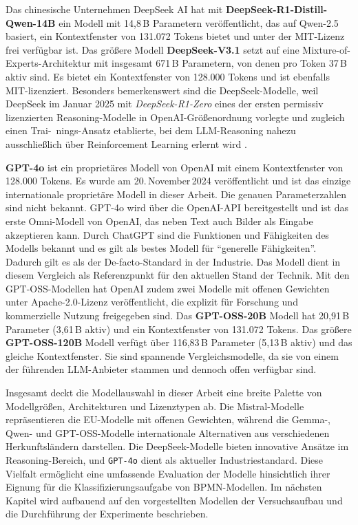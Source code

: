 Das chinesische Unternehmen DeepSeek AI hat mit \textbf{DeepSeek-R1-Distill-Qwen-14B} \cite{HF_DeepSeekR1_Distill_Qwen14B_2025} ein Modell mit 14{,}8\,B Parametern veröffentlicht, das auf Qwen-2.5 basiert, ein Kontextfenster von 131{.}072 Tokens bietet und unter der MIT-Lizenz frei verfügbar ist. Das größere Modell \textbf{DeepSeek-V3.1} \cite{HF_DeepSeek_V3_1_2025} setzt auf eine Mixture-of-Experts-Architektur mit insgesamt 671\,B Parametern, von denen pro Token 37\,B aktiv sind. Es bietet ein Kontextfenster von 128{.}000 Tokens und ist ebenfalls MIT-lizenziert. Besonders bemerkenswert sind die DeepSeek-Modelle, weil DeepSeek im Januar 2025 mit \emph{DeepSeek-R1-Zero} \cite{HF_DeepSeekR1_Zero_2025} eines der ersten permissiv lizenzierten Reasoning-Modelle in OpenAI-Größenordnung vorlegte und zugleich einen Trai-\linebreak~nings-Ansatz etablierte, bei dem \ac{LLM}-Reasoning nahezu ausschließlich über Reinforcement Learning erlernt wird \cite{deepseekai2025deepseekr1incentivizingreasoningcapability}.

\textbf{GPT-4o} \cite{openai-hello-gpt-4o} ist ein proprietäres Modell von OpenAI mit einem Kontextfenster von 128{.}000 Tokens. Es wurde am 20.\,November\,2024 veröffentlicht und ist das einzige internationale proprietäre Modell in dieser Arbeit. Die genauen Parameterzahlen sind nicht bekannt. GPT-4o wird über die OpenAI-API bereitgestellt und ist das erste Omni-Modell von OpenAI, das neben Text auch Bilder als Eingabe akzeptieren kann. Durch ChatGPT \cite{chatgpt} sind die Funktionen und Fähigkeiten des Modells bekannt und es gilt als bestes Modell für \enquote{generelle Fähigkeiten}. Dadurch gilt es als der De-facto-Standard in der Industrie. Das Modell dient in diesem Vergleich als Referenzpunkt für den aktuellen Stand der Technik. Mit den GPT-OSS-Modellen \cite{OpenAI_GPTOSS_ModelCard_2025} hat OpenAI zudem zwei Modelle mit offenen Gewichten unter Apache-2.0-Lizenz veröffentlicht, die explizit für Forschung und kommerzielle Nutzung freigegeben sind. Das \textbf{GPT-OSS-20B} Modell hat 20,91\,B Parameter (3,61\,B aktiv) und ein Kontextfenster von 131{.}072 Tokens. Das größere \textbf{GPT-OSS-120B} Modell verfügt über 116,83\,B Parameter (5,13\,B aktiv) und das gleiche Kontextfenster. Sie sind spannende Vergleichsmodelle, da sie von einem der führenden \ac{LLM}-Anbieter stammen und dennoch offen verfügbar sind.

Insgesamt deckt die Modellauswahl in dieser Arbeit eine breite Palette von Modellgrößen, Architekturen und Lizenztypen ab. Die Mistral-Modelle repräsentieren die \ac{EU}-Modelle mit offenen Gewichten, während die Gemma-, Qwen- und GPT-OSS-Modelle internationale Alternativen aus verschiedenen Herkunftsländern darstellen. Die DeepSeek-Modelle bieten innovative Ansätze im Reasoning-Bereich, und \texttt{GPT-4o} dient als aktueller Industriestandard. Diese Vielfalt ermöglicht eine umfassende Evaluation der Modelle hinsichtlich ihrer Eignung für die Klassifizierungsaufgabe von \ac{BPMN}-Modellen. Im nächsten Kapitel wird aufbauend auf den vorgestellten Modellen der Versuchsaufbau und die Durchführung der Experimente beschrieben.